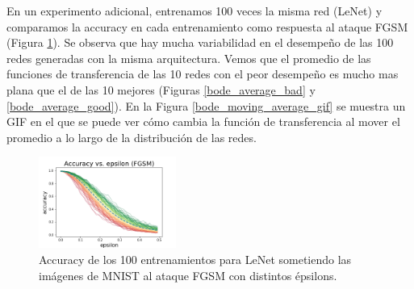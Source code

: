 En un experimento adicional, entrenamos 100 veces la misma red (LeNet) y comparamos la accuracy en cada entrenamiento como respuesta al ataque FGSM (Figura \ref{networks_sample}). Se observa que hay mucha variabilidad en el desempeño de las 100 redes generadas con la misma arquitectura. Vemos que el promedio de las funciones de transferencia de las 10 redes con el peor desempeño es mucho mas plana que el de las 10 mejores (Figuras \ref{bode_average_bad} y \ref{bode_average_good}). En la Figura \ref{bode_moving_average_gif} se muestra un GIF en el que se puede ver cómo cambia la función de transferencia al mover el promedio a lo largo de la distribución de las redes.

\begin{figure}[H]
    \centering
    \includegraphics[width=0.4\textwidth]{images/bode_diagrams/redes_sample.png}
    \caption{Accuracy de los 100 entrenamientos para LeNet sometiendo las imágenes de MNIST al ataque FGSM con distintos épsilons.}
    \label{networks_sample}
\end{figure}

